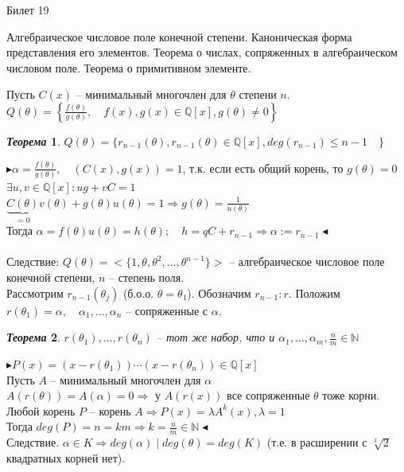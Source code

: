 \documentclass[a4paper,12pt]{article}
\newtheorem{teo}{\textit{Теорема}}
\newcommand{\TE}{\theta}
\newcommand{\AL}{\alpha}
\newcommand{\q}{\quad}
\newcommand{\pb}{\blacktriangleright}
\newcommand{\pe}{\blacktriangleleft}
\newcommand{\Ra}{\Rightarrow}
\newcommand{\bb}[1]{\mathbb{#1}}
\begin{document}
\newpage
\begin{mybox}{\hypertarget{bil19}{Билет 19}}

\begin{formbox}{}
Алгебраическое числовое поле конечной степени. Каноническая форма представления его элементов. Теорема о числах, сопряженных в алгебраическом числовом поле. Теорема о примитивном элементе.
\end{formbox}
Пусть $C(x)$ -- минимальный многочлен для $\TE$ степени $n$.\\
$Q(\TE) = \left\{  \frac{f(\TE)}{g(\TE)}, \q f(x), g(x) \in\bb{Q}[x], g(\TE)\not=0 \right\} $

\begin{formbox}{}
\begin{teo} $Q(\TE) = \{r_{n-1}(\TE), r_{n-1}(\TE)\in\bb{Q}[x], deg(r_{n-1})\le n - 1\q\} $
\end{teo}
\end{formbox}
$\pb \AL = \frac{f(\TE)}{g(\TE)}, \q (C(x), g(x)) = 1$, т.к. если есть общий корень, то $g(\TE) = 0$\\
$\exists u,v \in\bb{Q}[x]: ug+vC = 1$\\
$\underbrace{C(\TE)}_{=0}v(\TE) + g(\TE)u(\TE) = 1\Ra g(\TE) = \frac{1}{u(\TE)}  $\\
Тогда $\AL = f(\TE)u(\TE) = h(\TE);\q h = qC+r_{n-1}\Ra \AL:=r_{n-1} \pe$\\\q\\
Следствие: $Q(\TE) = <\{1, \TE, \TE^2, \dots, \TE^{n-1}\}>$ -- алгебраическое числовое поле конечной степени, $n$ -- степень поля.\\
Рассмотрим $r_{n-1}(\TE_j)$ (б.о.о. $\TE = \TE_1$). Обозначим $r_{n-1}: r$. Положим $r(\TE_1) = \AL,\q \AL_1,\dots, \AL_n$ -- сопряженные с $\AL$.\\

\begin{formbox}{}
\begin{teo} $r(\TE_1),\dots,r(\TE_n)$ -- тот же набор, что и $\AL_1, \dots, \AL_m, \frac{n}{m}\in\bb{N}$%
\end{teo}
\end{formbox}
$\pb P(x) = (x - r(\TE_1))\cdots(x - r(\TE_n)) \in \bb{Q}[x] $\\
Пусть $A$ -- минимальный многочлен для $\AL$\\
$A(r(\TE)) = A(\AL) = 0 \Ra$ у $A(r(x))$ все сопряженные $\TE$ тоже корни.\\
Любой корень $P$ -- корень $A\Ra P(x) = \lambda A^k(x), \lambda = 1$\\
Тогда $deg(P) = n = km \Ra k = \frac{n}{m}\in\bb{N} \pe$\\
Следствие. $\AL\in K \Ra deg(\AL) \mid deg(\TE) = deg(K)$ (т.е. в расширении с $\sqrt[3]{2}$ квадратных корней нет).


\end{mybox}
\end{document}

